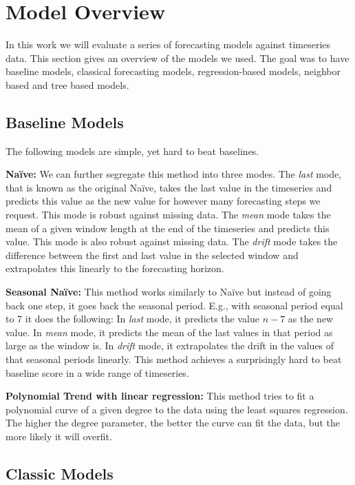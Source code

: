 \section{Model Overview}

In this work we will evaluate a series of forecasting models against timeseries data. This section gives an overview of the models we used. The goal was to have baseline models, classical forecasting models, regression-based models, neighbor based and tree based models.


\subsection{Baseline Models}

The following models are simple, yet hard to beat baselines.

\textbf{Na\"ive:} We can further segregate this method into three modes. The \emph{last} mode, that is known as the original Na\"ive, takes the last value in the timeseries and predicts this value as the new value for however many forecasting steps we request. This mode is robust against missing data. The \emph{mean} mode takes the mean of a given window length at the end of the timeseries and predicts this value. This mode is also robust against missing data. The \emph{drift} mode takes the difference between the first and last value in the selected window and extrapolates this linearly to the forecasting horizon.

\textbf{Seasonal Na\"ive:} This method works similarly to Na\"ive but instead of going back one step, it goes back the seasonal period. E.g., with seasonal period equal to 7 it does the following: In \emph{last} mode, it predicts the value \(n-7\) as the new value. In \emph{mean} mode, it predicts the mean of the last values in that period as large as the window is. In \emph{drift} mode, it extrapolates the drift in the values of that seasonal periods linearly. This method achieves a surprisingly hard to beat baseline score in a wide range of timeseries.

\textbf{Polynomial Trend with linear regression:} This method tries to fit a polynomial curve of a given degree to the data using the least squares regression. The higher the degree parameter, the better the curve can fit the data, but the more likely it will overfit.


\subsection{Classic Models}

